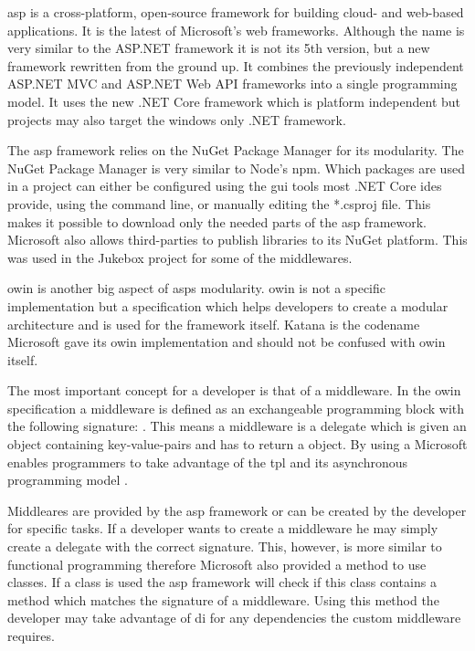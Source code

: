 



\gls{asp} is a cross-platform, open-source framework for building cloud- and web-based applications. It is the latest of Microsoft's web frameworks. Although the name is very similar to the ASP.NET framework it is not its 5th version, but a new framework rewritten from the ground up. It combines the previously independent ASP.NET MVC and ASP.NET Web API frameworks into a single programming model. It uses the new .NET Core framework which is platform independent but projects may also target the windows only .NET framework. \cite{introASP}


The \gls{asp} framework relies on the NuGet Package Manager for its modularity. The NuGet Package Manager is very similar to Node's \gls{npm}. Which packages are used in a project can either be configured using the \gls{gui} tools most .NET Core \gls{ide}s provide, using the command line, or manually editing the *.csproj file. This makes it possible to download only the needed parts of the \gls{asp} framework. Microsoft also allows third-parties to publish libraries to its NuGet platform. This was used in the Jukebox project for some of the middlewares.


\gls{owin} is another big aspect of \gls{asp}s modularity. \gls{owin} is not a specific implementation but a specification which helps developers to create a modular architecture and is used for the framework itself. Katana is the codename Microsoft gave its \gls{owin} implementation and should not be confused with \gls{owin} itself.

The most important concept for a developer is that of a middleware. In the \gls{owin} specification a middleware is defined as an exchangeable programming block with the following signature: . This means a middleware is a delegate which is given an  object containing key-value-pairs and has to return a  object. By using a  Microsoft enables programmers to take advantage of the \gls{tpl} and its asynchronous programming model \cite{tpl}.

Middleares are provided by the \gls{asp} framework or can be created by the developer for specific tasks. If a developer wants to create a middleware he may simply create a delegate with the correct signature. This, however, is more similar to functional programming therefore Microsoft also provided a method to use classes. If a class is used the \gls{asp} framework will check if this class contains a method which matches the signature of a middleware. Using this method the developer may take advantage of \gls{di} for any dependencies the custom middleware requires. \cite{owinKatana}

